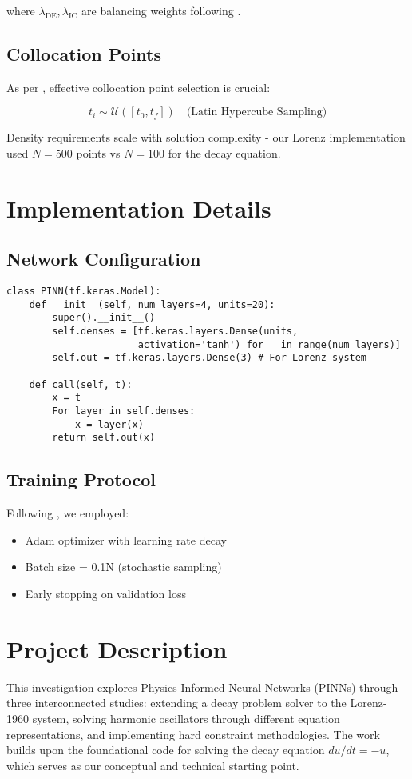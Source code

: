 \documentclass{article}
\begin{document}
where $\lambda_{\text{DE}}, \lambda_{\text{IC}}$ are balancing weights following \cite{lu2021deepxde}.

\subsection{Collocation Points}
As per \cite{module13030_2}, effective collocation point selection is crucial:

\begin{equation}
t_i \sim \mathcal{U}([t_0, t_f]) \quad \text{(Latin Hypercube Sampling)}
\end{equation}

Density requirements scale with solution complexity - our Lorenz implementation used $N=500$ points vs $N=100$ for the decay equation.

\section{Implementation Details}

\subsection{Network Configuration}
\begin{verbatim}
class PINN(tf.keras.Model):
    def __init__(self, num_layers=4, units=20):
        super().__init__()
        self.denses = [tf.keras.layers.Dense(units, 
                       activation='tanh') for _ in range(num_layers)]
        self.out = tf.keras.layers.Dense(3) # For Lorenz system
        
    def call(self, t):
        x = t
        For layer in self.denses:
            x = layer(x)
        return self.out(x)
\end{verbatim}

\subsection{Training Protocol}
Following \cite{module13030_2}, we employed:

\begin{itemize}
\item Adam optimizer with learning rate decay
\item Batch size = 0.1N (stochastic sampling)
\item Early stopping on validation loss
\end{itemize}
\section{Project Description}
This investigation explores Physics-Informed Neural Networks (PINNs) through three interconnected studies: extending a decay problem solver to the Lorenz-1960 system, solving harmonic oscillators through different equation representations, and implementing hard constraint methodologies. The work builds upon the foundational code for solving the decay equation $du/dt = -u$, which serves as our conceptual and technical starting point.
\end{document}
